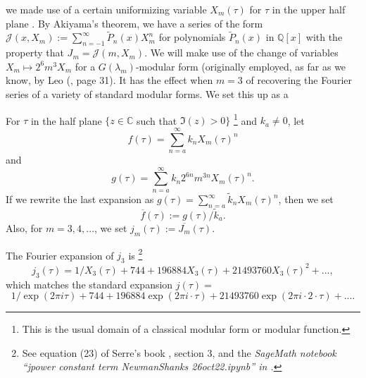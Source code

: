 \documentclass{article}
\begin{document}
we made use of a certain uniformizing
variable $X_m(\tau)$ 
for $\tau$ in the upper half 
plane \cite{interpolating}.
By Akiyama's theorem, we have a
series of the form
$\mathcal{J}(x,X_m) := 
\sum_{n=-1}^{\infty} \tilde{P}_n(x)X_m^n$
for polynomials $\tilde{P}_n(x)$ 
in $\mathbb{Q}[x]$
with the property that 
$J_m = \mathcal{J}(m,X_m)$.
We will make use of the change of
variables  $X_m \mapsto 2^6 m^3 X_m$ for a 
$G(\lambda_m)$-modular form (originally employed,
as far as we know, by Leo (\cite{leo2008fourier},
page 31). It has the effect when $m=3$
of recovering the Fourier series
of a variety of standard 
modular forms. We set this up as a 
\begin{definition}
For $\tau$ in the half plane
$\{z \in \mathbb{C}$ such that $\Im(z) >0\}$
\footnote{This is the usual domain of a
classical modular form or modular function.}
and $k_a \neq 0$, let 
$$
f(\tau) = \sum_{n=a}^{\infty} k_n X_m(\tau)^n
$$
and
$$
g(\tau) = \sum_{n=a}^{\infty} k_n 2^{6n} m^{3n} X_m(\tau)^n.
$$
If we rewrite the last expansion as 
$g(\tau)  = \sum_{n=a}^{\infty} \tilde{k}_n X_m(\tau)^n$,
then we set
$$\overline{f}(\tau) := g(\tau)/\tilde{k}_a.$$
Also, for $m  = 3, 4, ...$,
we set $j_m(\tau) := \overline{J_m}(\tau)$.
\end{definition} \noindent
The Fourier expansion of $j_3$
is 
\footnote{
See equation (23) of 
Serre's book 
\cite{serre1970course}, 
section 3, and the \it SageMath \rm notebook 
``jpower constant term NewmanShanks 26oct22.ipynb''
in 
\cite{githubNewmanShanks}.
}
$$j_3(\tau) = 
1/X_3(\tau) + 744 + 196884 X_3(\tau) + 
21493760 X_3(\tau)^2 + ...,
$$
which matches the  standard expansion $j(\tau) = $
$$
1/\exp(2\pi i \tau) + 744 + 
196884 \exp(2\pi i \cdot  \tau) + 
21493760 \exp(2\pi i\cdot  2 \cdot \tau ) + ....
$$
\end{document}
